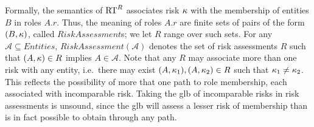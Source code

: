 Formally, the semantics of $\text{RT}^R$ associates risk $\kappa$ with the
membership of entities $B$ in roles $A.r$.  Thus, the meaning of roles
$A.r$ are finite sets of pairs of the form $(B,\kappa)$, called
$\mathit{RiskAssessment}$s; we let $R$ range over such sets.  For any
$\mathcal{A}\subseteq \mathit{Entities}$,
$\mathit{RiskAssessment}(\mathcal{A})$ denotes the set of risk
assessments $R$ such that $(A,\kappa) \in R$ implies $A \in
\mathcal{A}$.  Note that any $R$ may associate more than one risk with
any entity, i.e.~there may exist $(A,\kappa_1),(A,\kappa_2) \in R$ such
that $\kappa_1 \ne \kappa_2$.  This reflects the possibility of more
that one path to role membership, each associated with incomparable
risk.  Taking the glb of incomparable risks in risk assessments is
unsound, since the glb will assess a lesser risk of membership than is
in fact possible to obtain through any path.

